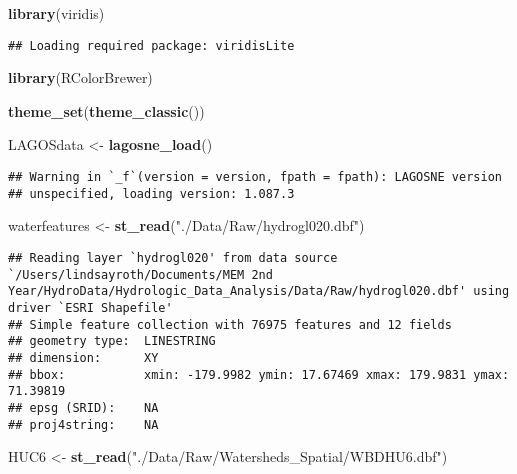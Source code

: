 \documentclass[]{article}
\newenvironment{Shaded}{\begin{snugshade}}{\end{snugshade}}
\newcommand{\KeywordTok}[1]{\textcolor[rgb]{0.13,0.29,0.53}{\textbf{#1}}}
\newcommand{\NormalTok}[1]{#1}
\newcommand{\StringTok}[1]{\textcolor[rgb]{0.31,0.60,0.02}{#1}}
\begin{document}
\begin{Shaded}
\begin{Highlighting}[]
\KeywordTok{library}\NormalTok{(viridis)}
\end{Highlighting}
\end{Shaded}

\begin{verbatim}
## Loading required package: viridisLite
\end{verbatim}

\begin{Shaded}
\begin{Highlighting}[]
\KeywordTok{library}\NormalTok{(RColorBrewer)}

\KeywordTok{theme_set}\NormalTok{(}\KeywordTok{theme_classic}\NormalTok{())}

\NormalTok{LAGOSdata <-}\StringTok{ }\KeywordTok{lagosne_load}\NormalTok{()}
\end{Highlighting}
\end{Shaded}

\begin{verbatim}
## Warning in `_f`(version = version, fpath = fpath): LAGOSNE version
## unspecified, loading version: 1.087.3
\end{verbatim}

\begin{Shaded}
\begin{Highlighting}[]
\NormalTok{waterfeatures <-}\StringTok{ }\KeywordTok{st_read}\NormalTok{(}\StringTok{"./Data/Raw/hydrogl020.dbf"}\NormalTok{)}
\end{Highlighting}
\end{Shaded}

\begin{verbatim}
## Reading layer `hydrogl020' from data source `/Users/lindsayroth/Documents/MEM 2nd Year/HydroData/Hydrologic_Data_Analysis/Data/Raw/hydrogl020.dbf' using driver `ESRI Shapefile'
## Simple feature collection with 76975 features and 12 fields
## geometry type:  LINESTRING
## dimension:      XY
## bbox:           xmin: -179.9982 ymin: 17.67469 xmax: 179.9831 ymax: 71.39819
## epsg (SRID):    NA
## proj4string:    NA
\end{verbatim}

\begin{Shaded}
\begin{Highlighting}[]
\NormalTok{HUC6 <-}\StringTok{ }\KeywordTok{st_read}\NormalTok{(}\StringTok{"./Data/Raw/Watersheds_Spatial/WBDHU6.dbf"}\NormalTok{)}
\end{Highlighting}
\end{Shaded}
\end{document}
